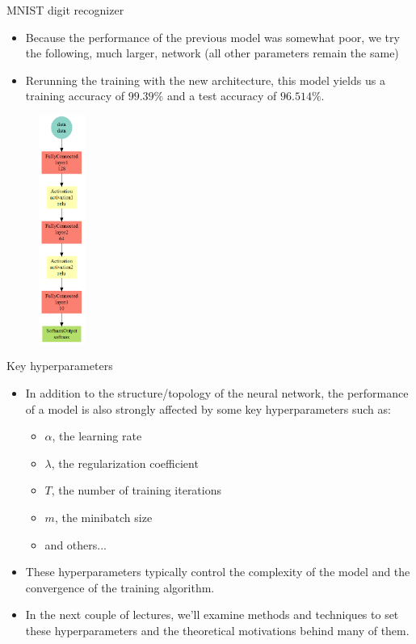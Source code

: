 \begin{vbframe}{MNIST digit recognizer}
\framebreak
  \begin{minipage}{0.45\textwidth}
    \begin{itemize}
      \item Because the performance of the previous model was somewhat poor, we try the following, much larger, network (all other parameters remain the same)
      \item Rerunning the training with the new architecture, this model yields us a training accuracy of $99.39\%$ and a test accuracy of $96.514\%$.
    \end{itemize}
  \end{minipage}
  \begin{minipage}{0.45\textwidth}
    \begin{figure}
      \centering
        \includegraphics[width=1.5cm]{figure/mxnet_codechunk_10.png}
    \end{figure}
  \end{minipage}
\end{vbframe}

\begin{frame} {Key hyperparameters}
  \begin{itemize}
    \item In addition to the structure/topology of the neural network, the performance of a model is also strongly affected by some key hyperparameters such as:
      \begin{itemize}
        \item $\alpha$, the learning rate
        \item $\lambda$, the regularization coefficient
        \item $T$, the number of training iterations
        \item $m$, the minibatch size
        \item and others...
      \end{itemize}
    \item These hyperparameters typically control the complexity of the model and the convergence of the training algorithm.
    \item In the next couple of lectures, we'll examine methods and techniques to set these hyperparameters and the theoretical motivations behind many of them.
  \end{itemize}
\end{frame}

